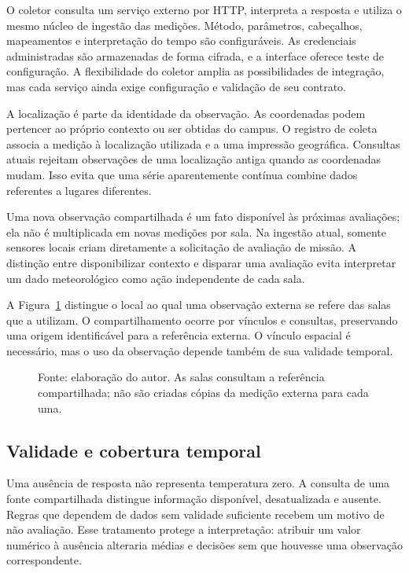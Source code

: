 \documentclass[tcc,capa]{texufpel}
\begin{document}
O coletor consulta um serviço externo por HTTP, interpreta a resposta e utiliza o mesmo núcleo de ingestão das medições. Método, parâmetros, cabeçalhos, mapeamentos e interpretação do tempo são configuráveis. As credenciais administradas são armazenadas de forma cifrada, e a interface oferece teste de configuração. A flexibilidade do coletor amplia as possibilidades de integração, mas cada serviço ainda exige configuração e validação de seu contrato.

A localização é parte da identidade da observação. As coordenadas podem pertencer ao próprio contexto ou ser obtidas do campus. O registro de coleta associa a medição à localização utilizada e a uma impressão geográfica. Consultas atuais rejeitam observações de uma localização antiga quando as coordenadas mudam. Isso evita que uma série aparentemente contínua combine dados referentes a lugares diferentes.

Uma nova observação compartilhada é um fato disponível às próximas avaliações; ela não é multiplicada em novas medições por sala. Na ingestão atual, somente sensores locais criam diretamente a solicitação de avaliação de missão. A distinção entre disponibilizar contexto e disparar uma avaliação evita interpretar um dado meteorológico como ação independente de cada sala.

A Figura~\ref{fig:contexto-compartilhado} distingue o local ao qual uma observação externa se refere das salas que a utilizam. O compartilhamento ocorre por vínculos e consultas, preservando uma origem identificável para a referência externa. O vínculo espacial é necessário, mas o uso da observação depende também de sua validade temporal.

\begin{figure}[htbp]\centering
\caption{Compartilhamento de uma observação externa entre avaliações de salas distintas.}
\label{fig:contexto-compartilhado}
\par\vspace{5mm}

\par\vspace{3mm}
\caption*{Fonte: elaboração do autor. As salas consultam a referência compartilhada; não são criadas cópias da medição externa para cada uma.}
\end{figure}

\subsection{Validade e cobertura temporal}
Uma ausência de resposta não representa temperatura zero. A consulta de uma fonte compartilhada distingue informação disponível, desatualizada e ausente. Regras que dependem de dados sem validade suficiente recebem um motivo de não avaliação. Esse tratamento protege a interpretação: atribuir um valor numérico à ausência alteraria médias e decisões sem que houvesse uma observação correspondente.
\end{document}
